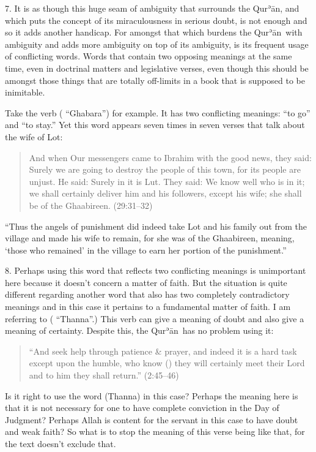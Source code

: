\documentclass[12pt]{memoir}
\def\´{ʾ} %
\newcommand{\ar}[1]{\RL{\arabicfont#1}}
\def \Quran{Qur\-\´ān} %
\def\–{-\hskip0pt}
\newcommand{\QRef}[1]{{\color{darkblue}#1}}
\begin{document}
7. It is as though this huge seam of ambiguity that surrounds the \Quran,
and which puts the concept of its miraculousness in serious doubt,
is not enough and so it adds another handicap.
For amongst that which burdens the \Quran\ with ambiguity
and adds more ambiguity on top of its ambiguity,
is its frequent usage of conflicting words.
Words that contain two opposing meanings at the same time,
even in doctrinal matters and legislative verses,
even though this should be amongst those things that are totally
off\–limits in a book that is supposed to be inimitable.

Take the verb (\ar{غَبَرَ} “Ghabara”) for example.
It has two conflicting meanings: “to go” and “to stay.”
Yet this word appears seven times in seven verses
that talk about the wife of Lot:

\begin{quote}
And when Our messengers came to Ibrahim with the good news, they said:
Surely we are going to destroy the people of this town,
for its people are unjust.
He said: Surely in it is Lut.
They said: We know well who is in it; we shall certainly deliver him
and his followers, except his wife; she shall be of the Ghaabireen.
(\QRef{29:31–32})
\end{quote}

“Thus the angels of punishment did indeed take Lot
and his family out from the village and made his wife to remain,
for she was of the Ghaabireen, meaning, ‘those who remained’
in the village to earn her portion of the punishment.”

8. Perhaps using this word that reflects two conflicting meanings
is unimportant here because it doesn’t concern a matter of faith.
But the situation is quite different regarding another word
that also has two completely contradictory meanings
and in this case it pertains to a fundamental matter of faith.
I am referring to (\ar{ظَنّ} “Thanna”.)
This verb can give a meaning of doubt
and also give a meaning of certainty.
Despite this, the \Quran\ has no problem using it:

\begin{quote}
“And seek help through patience \& prayer,
and indeed it is a hard task except upon the humble,
who know (\ar{يظنون}) they will certainly meet their Lord
and to him they shall return.” (\QRef{2:45–46})
\end{quote}

Is it right to use the word (Thanna) in this case?
Perhaps the meaning here is that it is not necessary
for one to have complete conviction in the Day of Judgment?
Perhaps Allah is content for the servant in this case
to have doubt and weak faith?
So what is to stop the meaning of this verse being like that,
for the text doesn’t exclude that.
\end{document}
